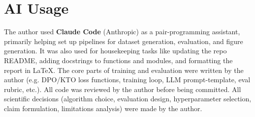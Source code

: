 \appendix
\section{AI Usage}
\label{sec:aiuse}

The author used \textbf{Claude Code} (Anthropic) as a pair-programming assistant, primarily helping set up pipelines for dataset generation, evaluation, and figure generation. It was also used for housekeeping tasks like updating the repo README, adding docstrings to functions and modules, and formatting the report in LaTeX. The core parts of training and evaluation were written by the author (e.g. DPO/KTO loss functions, training loop, LLM prompt-template, eval rubric, etc.). All code was reviewed by the author before being committed. All scientific decisions (algorithm choice, evaluation design, hyperparameter selection, claim formulation, limitations analysis) were made by the author.


